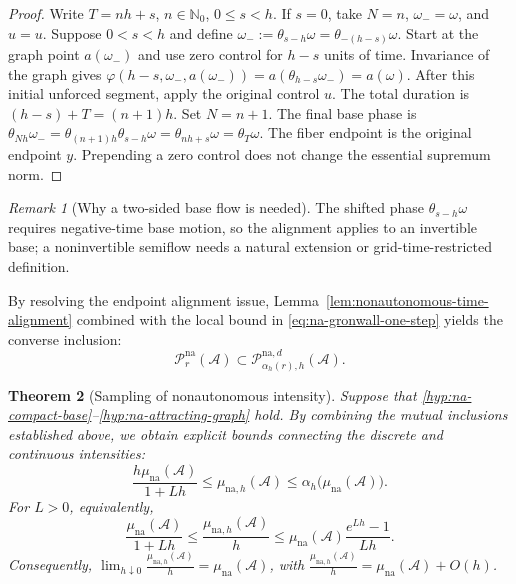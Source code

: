 \documentclass[pdflatex,sn-mathphys-num]{sn-jnl}
\numberwithin{equation}{section}
\theoremstyle{thmstyleone}%
\newtheorem{theorem}{Theorem}[section]
\theoremstyle{definition}
\theoremstyle{remark}
\newtheorem{remark}[theorem]{Remark}
\begin{document}
\begin{proof}
Write $T=nh+s$, $n\in\mathbb N_0$, $0\leq s<h$. If $s=0$, take $N=n$, $\omega_-=\omega$, and $\widehat u=u$. Suppose $0<s<h$ and define
    $\omega_-
    :=
    \theta_{s-h}\omega
    =
    \theta_{-(h-s)}\omega$.
Start at the graph point $a(\omega_-)$ and use zero control for $h-s$ units of time. Invariance of the graph gives
    $\varphi
    (h-s,\omega_-,a(\omega_-))
    =
    a(\theta_{h-s}\omega_-)
    =
    a(\omega)$.
After this initial unforced segment, apply the original control $u$. The total duration is $(h-s)+T=(n+1)h$. Set $N=n+1$. The final base phase is
    $\theta_{Nh}\omega_-
    =
    \theta_{(n+1)h}\theta_{s-h}\omega
    =
    \theta_{nh+s}\omega
     =
    \theta_T\omega$.
The fiber endpoint is the original endpoint $y$. Prepending a zero control does not change the essential supremum norm.
\end{proof}

\begin{remark}[Why a two-sided base flow is needed]
\label{rem:base-invertibility}
The shifted phase $\theta_{s-h}\omega$ requires negative-time base motion, so the alignment applies to an invertible base; a noninvertible semiflow needs a natural extension or grid-time-restricted definition.
\end{remark}

By resolving the endpoint alignment issue, Lemma~\ref{lem:nonautonomous-time-alignment} combined with the local bound in \eqref{eq:na-gronwall-one-step} yields the converse inclusion:
\begin{equation}
\label{eq:na-continuous-discrete-inclusion}
    \mathcal P_r^{\mathrm{na}}(\mathcal A)
    \subset
    \mathcal P_{\alpha_h(r),h}^{\mathrm{na},d}
    (\mathcal A).
\end{equation}

\begin{theorem}[Sampling of nonautonomous intensity]
\label{thm:nonautonomous-sampling}
Suppose that \ref{hyp:na-compact-base}--\ref{hyp:na-attracting-graph} hold. By combining the mutual inclusions established above, we obtain explicit bounds connecting the discrete and continuous intensities:
\[
    \frac{h\mu_{\mathrm{na}}(\mathcal A)}{1+Lh}
    \leq
    \mu_{\mathrm{na},h}(\mathcal A)
    \leq
    \alpha_h
    \bigl(
        \mu_{\mathrm{na}}(\mathcal A)
    \bigr).
\]
For $L>0$, equivalently,
\[
    \frac{\mu_{\mathrm{na}}(\mathcal A)}{1+Lh}
    \leq
    \frac{\mu_{\mathrm{na},h}(\mathcal A)}{h}
    \leq
    \mu_{\mathrm{na}}(\mathcal A)
    \frac{e^{Lh}-1}{Lh}.
\]
Consequently,
    $\lim_{h\downarrow0}
    \frac{
        \mu_{\mathrm{na},h}(\mathcal A)
    }{h}
    =
    \mu_{\mathrm{na}}(\mathcal A)$,
with
    $\frac{
        \mu_{\mathrm{na},h}(\mathcal A)
    }{h}
    =
    \mu_{\mathrm{na}}(\mathcal A)+O(h)$.
\end{theorem}
\end{document}
